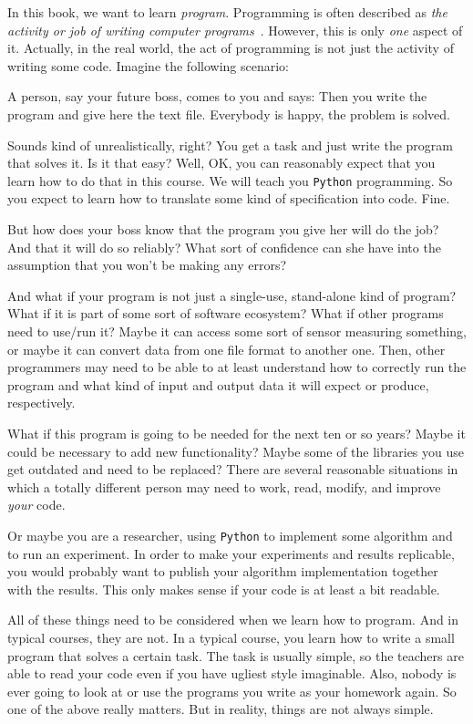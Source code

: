 \hsection{}%
%
%
In this book, we want to learn \emph{program}.
Programming is often described as \emph{the activity or job of writing computer programs}~\cite{CDE2024PMOPIE}.
However, this is only \emph{one} aspect of it.
Actually, in the real world, the act of programming is not just the activity of writing some code.
Imagine the following scenario:

A person, say your future boss, comes to you and says:
Then you write the program and give here the text file.
Everybody is happy, the problem is solved.

Sounds kind of unrealistically, right?
You get a task and just write the program that solves it.
Is it that easy?
Well, OK, you can reasonably expect that you learn how to do that in this course.
We will teach you \texttt{Python} programming.
So you expect to learn how to translate some kind of specification into code.
Fine.

But how does your boss know that the program you give her will do the job?
And that it will do so reliably?
What sort of confidence can she have into the assumption that you won't be making any errors?

And what if your program is not just a single-use, stand-alone kind of program?
What if it is part of some sort of software ecosystem?
What if other programs need to use/run it?
Maybe it can access some sort of sensor measuring something, or maybe it can convert data from one file format to another one.
Then, other programmers may need to be able to at least understand how to correctly run the program and what kind of input and output data it will expect or produce, respectively.

What if this program is going to be needed for the next ten or so years?
Maybe it could be necessary to add new functionality?
Maybe some of the libraries you use get outdated and need to be replaced?
There are several reasonable situations in which a totally different person may need to work, read, modify, and improve \emph{your} code.

Or maybe you are a researcher, using \texttt{Python} to implement some algorithm and to run an experiment.
In order to make your experiments and results replicable, you would probably want to publish your algorithm implementation together with the results.
This only makes sense if your code is at least a bit readable.

All of these things need to be considered when we learn how to program.
And in typical courses, they are not.
In a typical course, you learn how to write a small program that solves a certain task.
The task is usually simple, so the teachers are able to read your code even if you have ugliest style imaginable.
Also, nobody is ever going to look at or use the programs you write as your homework again.
So one of the above really matters.
But in reality, things are not always simple.

